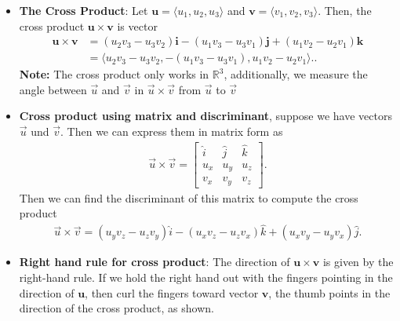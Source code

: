 \documentclass{report}
\begin{document}
\begin{itemize}
            \item \textbf{The Cross Product}: 
                Let $\mathbf{u} = \langle u_1, u_2, u_3 \rangle$ and $\mathbf{v} = \langle v_1, v_2, v_3 \rangle$.
                Then, the cross product $\mathbf{u} \times \mathbf{v}$ is vector
                \begin{align*}
                    \mathbf{u} \times \mathbf{v} &= (u_2 v_3 - u_3 v_2) \mathbf{i} - (u_1 v_3 - u_3 v_1) \mathbf{j} + (u_1 v_2 - u_2 v_1) \mathbf{k}  \\
                                                 &= \langle u_2 v_3 - u_3 v_2, -(u_1 v_3 - u_3 v_1), u_1 v_2 - u_2 v_1 \rangle.
                .\end{align*}
                \bigbreak \noindent 
                \textbf{Note:} The cross product only works in $\mathbb{R}^{3}$, additionally, we measure the angle between $\vec{u}$ and $\vec{v}$ in $\vec{u} \times \vec{v}$ from $\vec{u}$ to $\vec{v}$
            \item \textbf{Cross product using matrix and discriminant}, suppose we have vectors $\vec{u}$ und $\vec{v}$. Then we can express them in matrix form as
                \begin{align*}
                    \vec{u} \times \vec{v}  =
                    \begin{bmatrix}
                        \hat{i} & \hat{j} & \hat{k} \\
                        u_{x} & u_{y} & u_{z} \\
                        v_{x} & v_{y} & v_{z}
                    \end{bmatrix}
                .\end{align*}
                Then we can find the discriminant of this matrix to compute the cross product
                \begin{align*}
                    \vec{u} \times \vec{v} = (u_{y}v_{z} - u_{z}v_{y})\hat{i} - (u_{x}v_{z}-u_{z}v_{x})\hat{k} + (u_{x}v_{y} - u_{y}v_{x})\hat{j}
                .\end{align*}
            \item \textbf{Right hand rule for cross product}: 
                The direction of $\mathbf{u} \times \mathbf{v}$ is given by the right-hand rule. If we hold the right hand out with the fingers pointing in the direction of $\mathbf{u}$, then curl the fingers toward vector $\mathbf{v}$, the thumb points in the direction of the cross product, as shown.
                \bigbreak \noindent 

\end{itemize}
\end{document}

